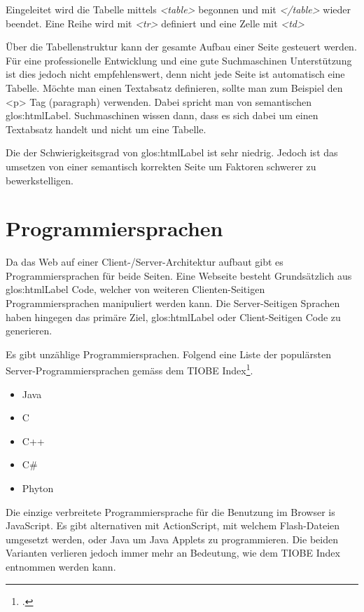 Eingeleitet wird die Tabelle mittels \textit{<table>} begonnen und mit \textit{</table>} wieder beendet. Eine Reihe wird mit \textit{<tr>} definiert und eine Zelle mit \textit{<td>}

Über die Tabellenstruktur kann der gesamte Aufbau einer Seite gesteuert werden. Für eine professionelle Entwicklung und eine gute Suchmaschinen Unterstützung ist dies jedoch nicht empfehlenswert, denn nicht jede Seite ist automatisch eine Tabelle. Möchte man einen Textabsatz definieren, sollte man zum Beispiel den <p> Tag (paragraph) verwenden. Dabei spricht man von semantischen \Gls{glos:htmlLabel}. Suchmaschinen wissen dann, dass es sich dabei um einen Textabsatz handelt und nicht um eine Tabelle.

Die der Schwierigkeitsgrad von \Gls{glos:htmlLabel} ist sehr niedrig. Jedoch ist das umsetzen von einer semantisch korrekten Seite um Faktoren schwerer zu bewerkstelligen.

\section{Programmiersprachen}
Da das Web auf einer  Client-/Server-Architektur aufbaut gibt es Programmiersprachen für beide Seiten. Eine Webseite besteht Grundsätzlich aus \Gls{glos:htmlLabel} Code, welcher von weiteren Clienten-Seitigen Programmiersprachen manipuliert werden kann. Die Server-Seitigen Sprachen haben hingegen das primäre Ziel, \Gls{glos:htmlLabel} oder Client-Seitigen Code zu generieren.

Es gibt unzählige Programmiersprachen. Folgend eine Liste der populärsten Server-Programmiersprachen gemäss dem TIOBE Index\footcite{TIOBE_Software_Tiobe_Index_2015-06-04}.

\begin{itemize}
\item Java
\item C
\item C++
\item C\#
\item Phyton
\end{itemize}

Die einzige verbreitete Programmiersprache für die Benutzung im Browser is JavaScript. Es gibt alternativen mit ActionScript, mit welchem Flash-Dateien umgesetzt werden, oder Java um Java Applets zu programmieren. Die beiden Varianten verlieren jedoch immer mehr an Bedeutung, wie dem TIOBE Index entnommen werden kann.

